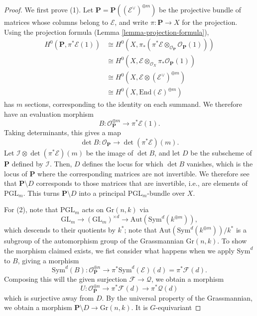 \begin{proof}
We first prove (1).
Let $\mathbf{P} = \mathbf{P}( (\mathcal{E}^\vee)^{\oplus m})$ be the projective
bundle of matrices whose columns belong to $\mathcal{E}$, and write $\pi :
\mathbf{P} \to X$ for the projection.
Using the projection formula (Lemma \ref{lemma-projection-formula}),
\begin{align*}
H^0(\mathbf{P}, \pi^*\mathcal{E}(1))
& \cong H^0(X, \pi_*(\pi^*\mathcal{E} \otimes_{\mathcal{O}_{\mathbf{P}}}
\mathcal{O}_{\mathbf{P}}(1)))\\
& \cong H^0(X,\mathcal{E} \otimes_{\mathcal{O}_X}
\pi_*\mathcal{O}_{\mathbf{P}}(1))\\
& \cong H^0(X,\mathcal{E} \otimes (\mathcal{E}^\vee)^{\oplus m})\\
& \cong H^0(X,\mathrm{End}(\mathcal{E})^{\oplus m})
\end{align*}
has $m$ sections, corresponding to the identity on each summand.
We therefore have an evaluation morphism
$$
B : \mathcal{O}_{\mathbf{P}}^{\oplus m} \longrightarrow \pi^*\mathcal{E}(1).
$$
Taking determinants, this gives a map
$$
\det B : \mathcal{O}_{\mathbf{P}} \longrightarrow \det(\pi^*\mathcal{E}) (m).
$$
Let $\mathcal{I} \otimes \det(\pi^*\mathcal{E}) (m)$ be the image of $\det B$,
and let $D$ be the subscheme of $\mathbf{P}$ defined by $\mathcal{I}$.
Then, $D$ defines the locus for which $\det B$ vanishes, which is the locus of
$\mathbf{P}$ where the corresponding matrices are not invertible. We therefore
see that $\mathbf{P} \setminus D$ corresponds to those matrices that are
invertible, i.e., are elements of $\mathrm{PGL}_m$. This turns $\mathbf{P}
\setminus D$ into a principal $\mathrm{PGL}_m$-bundle over $X$.

For (2), note that $\mathrm{PGL}_m$ acts on $\mathrm{Gr}(n,k)$ via
$$
\mathrm{GL}_m \longrightarrow (\mathrm{GL}_m)^{\times d} \longrightarrow
\mathrm{Aut}(\mathrm{Sym}^d (k^{\oplus m})),
$$
which descends to their quotients by $k^*$; note that
$\mathrm{Aut}(\mathrm{Sym}^d (k^{\oplus m}))/k^*$ is a subgroup of the
automorphism group of the Grassmannian $\mathrm{Gr}(n,k)$.
To show the morphism claimed exists, we fist consider what happens when we
apply $\mathrm{Sym}^d$ to $B$, giving a morphism
$$
  \mathrm{Sym}^d(B) : \mathcal{O}_{\mathbf{P}}^{\oplus n} \to
    \pi^*\mathrm{Sym}^d(\mathcal{E})(d) = \pi^*\mathcal{F}(d).
$$
Composing this will the given surjection $\mathcal{F} \to \mathcal{Q}$, we
obtain a morphism
$$
  U : \mathcal{O}_{\mathbf{P}}^{\oplus n} \to
        \pi^*\mathcal{F}(d) \to
        \pi^*\mathcal{Q}(d)
$$
which is surjective away from $D$.
By the universal property of the Grassmannian, we obtain a morphism
$\mathbf{P} \setminus D \to \mathrm{Gr}(n,k)$. It is $G$-equivariant
\end{proof}


